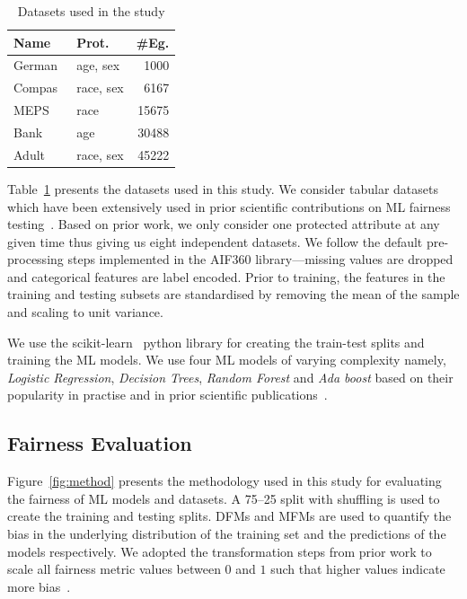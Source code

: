\documentclass[sigconf,review,anonymous]{acmart}
\begin{document}
\begin{table}
  \centering
  \begin{tabular}{l l r}
    \toprule
    \textbf{Name} & \textbf{Prot.} & \textbf{\#Eg.}\\
    \midrule
    German \cite{hofmann1994german} & age, sex & 1000\\
    Compas\cite{angwin2016machine} & race, sex & 6167\\
    MEPS \cite{mepsdata} & race & 15675\\
    Bank\cite{moro2014data} & age & 30488\\
    Adult\cite{kohavi1996scaling} & race, sex & 45222\\
    \bottomrule
  \end{tabular}
  \caption{Datasets used in the study}
  \label{tab:datasets}
\end{table}

Table \ref{tab:datasets} presents the datasets used in this study. We
consider tabular datasets which have been extensively used in prior
scientific contributions on ML fairness
testing \cite{zhang2021ignorance,biswas2020machine,biswas2021fair,chen2022fairness}. Based
on prior work, we only consider one protected attribute at any given
time thus giving us eight independent datasets. We follow the default
pre-processing steps implemented in the AIF360 library---missing
values are dropped and categorical features are label encoded. Prior
to training, the features in the training and testing subsets are
standardised by removing the mean of the sample and scaling to unit
variance.

We use the scikit-learn \cite{pedregosa2011scikit} python library for
creating the train-test splits and training the ML models. We use four
ML models of varying complexity namely, \emph{Logistic Regression},
\emph{Decision Trees}, \emph{Random Forest} and \emph{Ada boost} based
on their popularity in practise and in prior scientific
publications \cite{zhang2021ignorance,biswas2021fair,biswas2020machine}.

\subsection{Fairness Evaluation}\label{sec:method-fair-eval}

Figure \ref{fig:method} presents the methodology used in this study
for evaluating the fairness of ML models and datasets. A 75--25 split
with shuffling is used to create the training and testing splits. DFMs
and MFMs are used to quantify the bias in the underlying distribution
of the training set and the predictions of the models respectively. We
adopted the transformation steps from prior work to scale all fairness
metric values between $0$ and $1$ such that higher values indicate
more bias \cite{zhang2021ignorance,hort2021fairea}.
\end{document}

